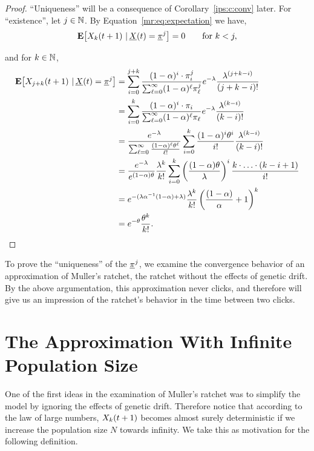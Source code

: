 \begin{proof}
``Uniqueness'' will be a consequence of Corollary~\ref{ips:c:conv} later. For
``existence'', let $j \in \mathbb{N}$. By Equation~\eqref{mr:eq:expectation} we have,
$$\mathbf{E} \! \left[  X_{k} \! \left( t+1 \right) \, | \, \underline{X}\!\left(t\right) =
\underline{\pi}^j  \right] = 0 \qquad \text{for } k < j,$$ 

\noindent
and for $k \in \mathbb{N}$,
\begin{align*}
\mathbf{E} \! \left[  X_{j+k} \! \left( t+1 \right) \, | \, \underline{X}\!\left(t\right) = \underline{\pi}^j  \right]
  &= \sum_{i=0}^{j+k} \frac{(1-\alpha)^{i} \cdot \pi^j_i }
  					   {\sum_{\ell=0}^\infty (1-\alpha)^\ell \pi^j_\ell} e^{-\lambda}
  					   \frac{\lambda^{(j+k-i)}}{(j+k-i)!} \\
 &= \sum_{i=0}^{k} \frac{(1-\alpha)^{i} \cdot \pi_i }
  					   {\sum_{\ell=0}^\infty (1-\alpha)^\ell \pi_\ell} e^{-\lambda}
  					   \frac{\lambda^{(k-i)}}{(k-i)!} \\ 			   
  &= \frac{e^{-\lambda}}{\sum_{\ell=0}^\infty \frac{(1-\alpha)^{\ell}
  \theta^\ell}{\ell!}}
     \sum_{i=0}^k \frac{(1-\alpha)^{i} \theta^i}{i!}
     \frac{\lambda^{(k-i)}}{(k-i)!}  \\
  &= \frac{e^{-\lambda}}{e^{(1-\alpha)\theta}}
  	 \frac{\lambda^k}{k!} 
  	 \sum_{i=0}^k \left( \frac{(1-\alpha) \theta}{\lambda} \right)^i
  	 \frac{k \cdot \ldots \cdot (k-i+1)}{i!} \\
  &= e^{-(\lambda \alpha^{-1} (1-\alpha) + \lambda)}
     \frac{\lambda^k}{k!}
     \left( \frac{(1-\alpha)}{\alpha} + 1 \right)^k \\
  &= e^{-\theta} \frac{\theta^k}{k!}. \qedhere
\end{align*}
\end{proof}

\noindent
To prove the ``uniqueness'' of the $\underline{\pi}^j$, we examine the convergence
behavior of an approximation of Muller's ratchet, the ratchet without the effects of genetic drift. By the above argumentation, this
approximation never clicks, and therefore will give us an impression of the ratchet's behavior in
the time between two clicks.

\section{The Approximation With Infinite Population Size}
One of the first ideas in the examination of Muller's ratchet was to simplify the model by ignoring
the effects of genetic drift. Therefore notice that according to the law of large numbers,
$X_{k} \! \left( t+1 \right)$ becomes almost surely deterministic if we increase the population size $N$ towards
infinity. We take this as motivation for the following definition.

